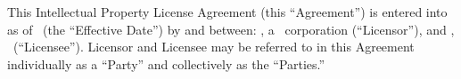 
\bigskip

\noindent This Intellectual Property License Agreement (this ``Agreement'') is entered into
as of \effectiveDate\ (the ``Effective Date'') by and between: \companyName, a
\companyState\ corporation (``Licensor''), and \licenseeName, \licenseeType\ (``Licensee'').
Licensor and Licensee may be referred to in this Agreement individually as a ``Party'' and
collectively as the ``Parties.''

